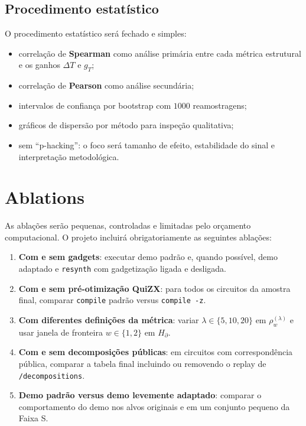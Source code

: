 \documentclass[a4paper,11pt]{article}
\begin{document}
\subsection*{Procedimento estatístico}

O procedimento estatístico será fechado e simples:
\begin{itemize}
  \item correlação de \textbf{Spearman} como análise primária entre cada métrica estrutural e os ganhos $\Delta T$ e $g_T$;
  \item correlação de \textbf{Pearson} como análise secundária;
  \item intervalos de confiança por bootstrap com $1000$ reamostragens;
  \item gráficos de dispersão por método para inspeção qualitativa;
  \item sem ``p-hacking'': o foco será tamanho de efeito, estabilidade do sinal e interpretação metodológica.
\end{itemize}

\section{Ablations}

As ablações serão pequenas, controladas e limitadas pelo orçamento computacional. O projeto incluirá obrigatoriamente as seguintes ablações:

\begin{enumerate}
  \item \textbf{Com e sem gadgets}: executar demo padrão e, quando possível, demo adaptado e \texttt{resynth} com gadgetização ligada e desligada.
  \item \textbf{Com e sem pré-otimização QuiZX}: para todos os circuitos da amostra final, comparar \texttt{compile} padrão versus \texttt{compile -z}.
  \item \textbf{Com diferentes definições da métrica}: variar $\lambda \in \{5,10,20\}$ em $\rho_w^{(\lambda)}$ e usar janela de fronteira $w \in \{1,2\}$ em $H_{\partial}$.
  \item \textbf{Com e sem decomposições públicas}: em circuitos com correspondência pública, comparar a tabela final incluindo ou removendo o replay de \texttt{/decompositions}.
  \item \textbf{Demo padrão versus demo levemente adaptado}: comparar o comportamento do demo nos alvos originais e em um conjunto pequeno da Faixa S.
\end{enumerate}
\end{document}
